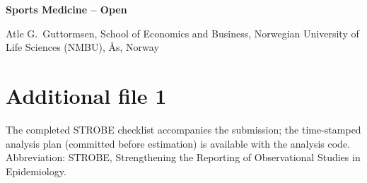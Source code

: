 \documentclass[12pt,a4paper]{article}
\begin{document}
\noindent\textbf{Sports Medicine -- Open}

\bigskip
{}

\medskip
\noindent Atle G.\ Guttormsen, School of Economics and Business, Norwegian University of Life Sciences (NMBU), Ås, Norway

\section*{Additional file 1}

\begin{table}[H]
\centering
\caption*{\textbf{Table S1.} Sample flow.}
\small

\vspace{0.2em}
\parbox{0.8\textwidth}{\footnotesize The completed STROBE checklist accompanies the submission; the time-stamped analysis plan (committed before estimation) is available with the analysis code. Abbreviation: STROBE, Strengthening the Reporting of Observational Studies in Epidemiology.}
\end{table}
\end{document}
